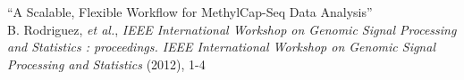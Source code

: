 ``A Scalable, Flexible Workflow for MethylCap-Seq Data Analysis'' \\
\small{B. Rodriguez, \textit{et al.}, \textit{IEEE International Workshop on Genomic Signal Processing and Statistics : proceedings. IEEE International Workshop on Genomic Signal Processing and Statistics} (2012), 1-4} \\
